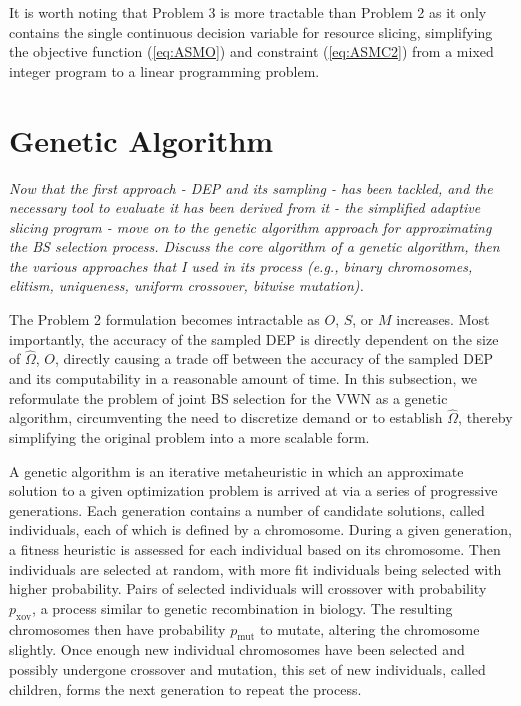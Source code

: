 \documentclass[12pt,dvipsnames]{report}
\begin{document}
It is worth noting that Problem 3 is more tractable than Problem 2 as it only contains the single continuous decision variable for resource slicing, simplifying the objective function (\cref{eq:ASMO}) and constraint (\cref{eq:ASMC2}) from a mixed integer program to a linear programming problem.

\section{Genetic Algorithm} \label{sec:ga}

\textit{Now that the first approach - DEP and its sampling - has been tackled, and the necessary tool to evaluate it has been derived from it - the simplified adaptive slicing program - move on to the genetic algorithm approach for approximating the BS selection process.  Discuss the core algorithm of a genetic algorithm, then the various approaches that I used in its process (e.g., binary chromosomes, elitism, uniqueness, uniform crossover, bitwise mutation).}

The Problem 2 formulation becomes intractable as $O$, $S$, or $M$ increases.  Most importantly, the accuracy of the sampled DEP is directly dependent on the size of $\hat{\Omega}$, $O$, directly causing a trade off between the accuracy of the sampled DEP and its computability in a reasonable amount of time.  In this subsection, we reformulate the problem of joint BS selection for the VWN as a genetic algorithm, circumventing the need to discretize demand or to establish $\hat{\Omega}$, thereby simplifying the original problem into a more scalable form.

A genetic algorithm is an iterative metaheuristic in which an approximate solution to a given optimization problem is arrived at via a series of progressive generations.  Each generation contains a number of candidate solutions, called individuals, each of which is defined by a chromosome.  During a given generation, a fitness heuristic is assessed for each individual based on its chromosome.  Then individuals are selected at random, with more fit individuals being selected with higher probability.  Pairs of selected individuals will crossover with probability $p_\text{xov}$, a process similar to genetic recombination in biology.  The resulting chromosomes then have probability $p_\text{mut}$ to mutate, altering the chromosome slightly.  Once enough new individual chromosomes have been selected and possibly undergone crossover and mutation, this set of new individuals, called children, forms the next generation to repeat the process.  %
\end{document}

